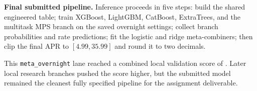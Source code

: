\textbf{Final submitted pipeline.} Inference proceeds in five steps: build the shared engineered table; train XGBoost, LightGBM, CatBoost, ExtraTrees, and the multitask MPS branch on the saved overnight settings; collect branch probabilities and rate predictions; fit the logistic and ridge meta-combiners; then clip the final APR to \([4.99, 35.99]\) and round it to two decimals.

This \texttt{meta\_overnight} lane reached a combined local validation score of \publicscore. Later local research branches pushed the score higher, but the submitted model remained the cleanest fully specified pipeline for the assignment deliverable.

